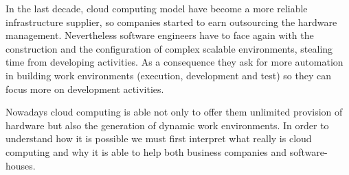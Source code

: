 In the last decade, cloud computing model have become a more reliable infrastructure supplier, so companies 
started to earn outsourcing the hardware management. Nevertheless software engineers have to face again
with the construction and the configuration of complex scalable environments, stealing time from developing
activities. As a consequence they ask for more automation in building work environments  (execution,
development and test) so they can focus more on development activities.

Nowadays cloud computing is able not only to offer them unlimited provision of hardware but also
the generation of dynamic work environments. In order to understand how it is possible we must first
interpret what really is cloud computing and why it is able to help both business companies and
software-houses.